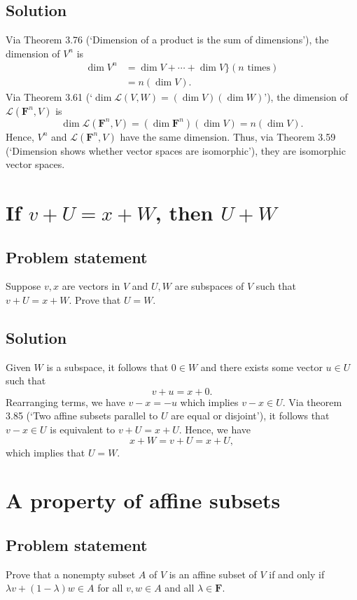 \documentclass{article}
\begin{document}
\subsection*{Solution}
Via Theorem 3.76 (`Dimension of a product is the sum of dimensions'), the dimension of $V^n$ is
\begin{align*}
    \operatorname{dim}V^n&=\operatorname{dim}V+\cdots+\operatorname{dim}V\Big\}(n\text{ times})\\
    &=n(\operatorname{dim}V).
\end{align*}
Via Theorem 3.61 (`$\operatorname{dim}\mathcal{L}(V,W)=(\operatorname{dim}V)(\operatorname{dim}W)$'), the dimension of $\mathcal{L}(\mathbf{F}^n,V)$ is
\[\operatorname{dim}\mathcal{L}(\mathbf{F}^n,V)=(\operatorname{dim}\mathbf{F}^n)(\operatorname{dim}V)=n(\operatorname{dim}V).\]
Hence, $V^n$ and $\mathcal{L}(\mathbf{F}^n,V)$ have the same dimension. 
Thus, via Theorem 3.59 (`Dimension shows whether vector spaces are isomorphic'), they are isomorphic vector spaces. 

\clearpage

\section{If $v+U=x+W$, then $U+W$}
\subsection*{Problem statement}
Suppose $v,x$ are vectors in $V$ and $U,W$ are subspaces of $V$ such that\newline $v+U=x+W$. 
Prove that $U=W$.

\subsection*{Solution}
Given $W$ is a subspace, it follows that $0\in W$ and there exists some vector $u\in U$ such that
\[v+u=x+0.\]
Rearranging terms, we have $v-x=-u$ which implies $v-x\in U$. 
Via theorem 3.85 (`Two affine subsets parallel to $U$ are equal or disjoint'), it follows that $v-x\in U$ is equivalent to $v+U=x+U$. 
Hence, we have 
\[x+W=v+U=x+U,\]
which implies that $U=W$.

\clearpage

\section{A property of affine subsets}
\subsection*{Problem statement}
Prove that a nonempty subset $A$ of $V$ is an affine subset of $V$ if and only if $\lambda v+(1-\lambda)w\in A$ for all $v,w\in A$ and all $\lambda\in\mathbf{F}$.
\end{document}
